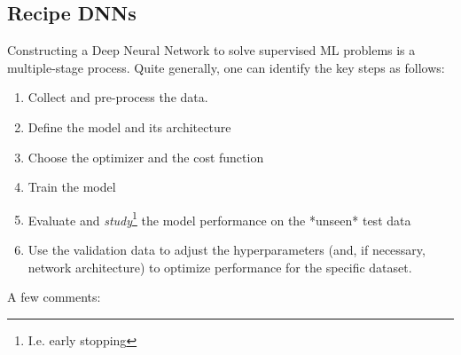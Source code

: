 \subsection{Recipe DNNs}
\label{subsec:dnnRecipe}
Constructing a Deep Neural Network to solve supervised ML problems is a multiple-stage process. Quite generally, one can identify the key steps as follows:
\begin{enumerate} 
	\item Collect and pre-process the data.
	\item  Define the model and its architecture
	\item  Choose the optimizer and the cost function
	\item  Train the model 
	\item  Evaluate and \emph{study}\footnote{I.e. early stopping} the model performance on the *unseen* test data
	\item Use the validation data to adjust the hyperparameters (and, if necessary, network architecture) to optimize performance for the specific dataset.
\end{enumerate}
A few comments:
